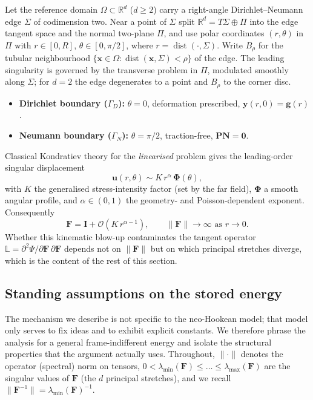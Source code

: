 Let the reference domain $\Omega \subset \mathbb{R}^d$ ($d\ge2$) carry a right-angle Dirichlet--Neumann edge
$\Sigma$ of codimension two. Near a point of $\Sigma$ split $\mathbb{R}^d = T\Sigma \oplus \Pi$ into the edge tangent
space and the normal two-plane $\Pi$, and use polar coordinates $(r,\theta)$ in $\Pi$ with $r\in[0,R]$,
$\theta\in[0,\pi/2]$, where $r=\operatorname{dist}(\cdot,\Sigma)$. Write $B_\rho$ for the tubular neighbourhood
$\{\bm{x}\in\Omega : \operatorname{dist}(\bm{x},\Sigma)<\rho\}$ of the edge. The leading singularity is governed by the
transverse problem in $\Pi$, modulated smoothly along $\Sigma$; for $d=2$ the edge degenerates to a point and
$B_\rho$ to the corner disc.
\begin{itemize}
    \item \textbf{Dirichlet boundary ($\Gamma_D$):} $\theta = 0$, deformation prescribed, $\bm{y}(r,0) = \bm{g}(r)$.
    \item \textbf{Neumann boundary ($\Gamma_N$):} $\theta = \pi/2$, traction-free, $\bm{P}\bm{N} = \bm{0}$.
\end{itemize}

Classical Kondratiev theory for the \emph{linearised} problem gives the leading-order singular displacement
\begin{equation}
    \label{eq:kondratiev}
    \bm{u}(r,\theta) \sim K\, r^{\alpha}\,\bm{\Phi}(\theta),
\end{equation}
with $K$ the generalised stress-intensity factor (set by the far field), $\bm{\Phi}$ a smooth angular profile, and
$\alpha\in(0,1)$ the geometry- and Poisson-dependent exponent. Consequently
\begin{equation}
    \label{eq:Fblowup}
    \bm{F} = \bm{I} + \mathcal{O}\!\left(K\,r^{\alpha-1}\right), \qquad \|\bm{F}\|\to\infty \text{ as } r\to 0 .
\end{equation}
Whether this kinematic blow-up contaminates the tangent operator $\mathbb{L}=\partial^2\Psi/\partial\bm{F}\,\partial\bm{F}$
depends not on $\|\bm{F}\|$ but on which principal stretches diverge, which is the content of the rest of this section.

\subsection{Standing assumptions on the stored energy}

The mechanism we describe is not specific to the neo-Hookean model; that model only serves to fix ideas and to exhibit
explicit constants. We therefore phrase the analysis for a general frame-indifferent energy and isolate the structural
properties that the argument actually uses. Throughout, $\|\cdot\|$ denotes the operator (spectral) norm on tensors,
$0<\lambda_{\min}(\bm{F})\le\dots\le\lambda_{\max}(\bm{F})$ are the singular values of $\bm{F}$ (the $d$ principal
stretches), and we recall $\|\bm{F}^{-1}\| = \lambda_{\min}(\bm{F})^{-1}$.

